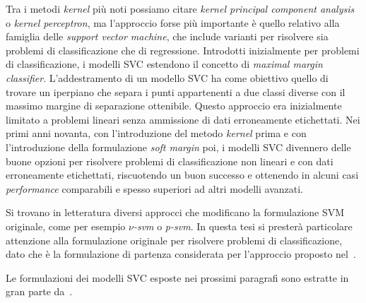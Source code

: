 Tra i metodi \emph{kernel} più noti possiamo citare \emph{kernel principal component analysis}\cite{kernel_PCA} o \emph{kernel perceptron}\cite{kernel_perceptron}, ma l'approccio forse più importante è quello relativo alla famiglia delle \emph{support vector machine}, che include varianti per risolvere sia problemi di classificazione che di regressione.
Introdotti inizialmente per problemi di classificazione, i modelli SVC estendono il concetto di \emph{maximal margin classifier}. 
L'addestramento di un modello SVC ha come obiettivo quello di trovare un iperpiano che separa i punti appartenenti a due classi diverse con il massimo margine di separazione ottenibile. 
Questo approccio era inizialmente limitato a problemi lineari senza ammissione di dati erroneamente etichettati. 
Nei primi anni novanta, con l'introduzione del metodo \emph{kernel}\cite{1992_hardmargin_svm} prima e con l'introduzione della formulazione \emph{soft margin}\cite{1995_svm} poi, i modelli SVC divennero delle buone opzioni per risolvere problemi di classificazione non lineari e con dati erroneamente etichettati, riscuotendo un buon successo e ottenendo in alcuni casi \emph{performance} comparabili e spesso superiori ad altri modelli avanzati. 

Si trovano in letteratura diversi approcci che modificano la formulazione SVM originale, come per esempio \emph{$\nu$-svm}\cite{2000_nu_svm} o  \emph{p-svm}\cite{2001_p_svm}.
In questa tesi si presterà particolare attenzione alla formulazione originale per risolvere problemi di classificazione, dato che è la formulazione di partenza considerata per l'approccio proposto nel~.

Le formulazioni dei modelli SVC esposte nei prossimi paragrafi sono estratte in gran parte da~\cite{1995_svm,svm_tutorial,elements-of-statistical-learning}.


